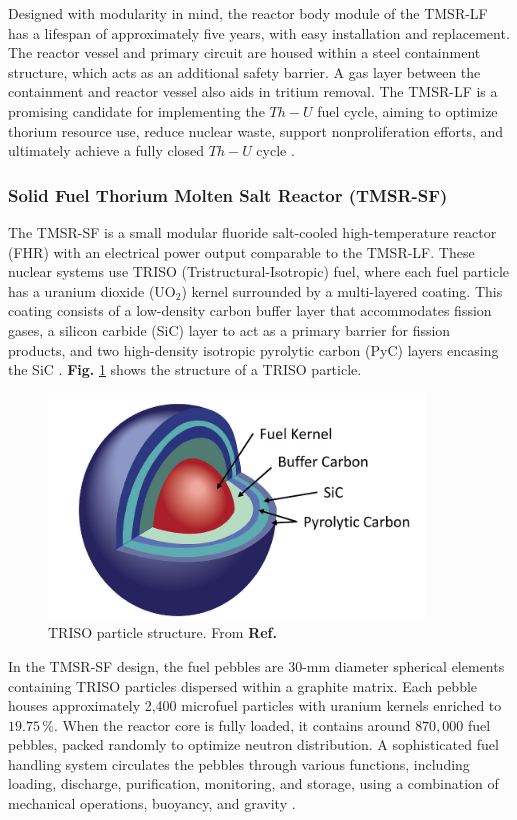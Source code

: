 Designed with modularity in mind, the reactor body module of the TMSR-LF has a lifespan of approximately five years, with easy installation and replacement. The reactor vessel and primary circuit are housed within a steel containment structure, which acts as an additional safety barrier. A gas layer between the containment and reactor vessel also aids in tritium removal. The TMSR-LF is a promising candidate for implementing the \(Th-U\) fuel cycle, aiming to optimize thorium resource use, reduce nuclear waste, support nonproliferation efforts, and ultimately achieve a fully closed \(Th-U\) cycle \cite{TMSR_book}.

\subsubsection{Solid Fuel Thorium Molten Salt Reactor (TMSR-SF)}

The TMSR-SF is a small modular fluoride salt-cooled high-temperature reactor (FHR) with an electrical power output comparable to the TMSR-LF. These nuclear systems use TRISO (Tristructural-Isotropic) fuel, where each fuel particle has a uranium dioxide (\(\text{UO}_2\)) kernel surrounded by a multi-layered coating. This coating consists of a low-density carbon buffer layer that accommodates fission gases, a silicon carbide (SiC) layer to act as a primary barrier for fission products, and two high-density isotropic pyrolytic carbon (PyC) layers encasing the SiC \cite{TRISO, IAEA_TRISO_REPORT}. \textbf{Fig.} \ref{fig:TRISO} shows the structure of a TRISO particle.

\begin{figure}[H]
    \centering
    \includegraphics[scale=0.5]{Kap6/Figures_Kap6/TRISO_particle.png}
    \caption{TRISO particle structure. From \textbf{Ref.} \cite{IAEA_TRISO_REPORT}}
    \label{fig:TRISO}
\end{figure}

In the TMSR-SF design, the fuel pebbles are 30-mm diameter spherical elements containing TRISO particles dispersed within a graphite matrix. Each pebble houses approximately 2,400 microfuel particles with uranium kernels enriched to \(19.75 \, \%\). When the reactor core is fully loaded, it contains around \(870,000\) fuel pebbles, packed randomly to optimize neutron distribution. A sophisticated fuel handling system circulates the pebbles through various functions, including loading, discharge, purification, monitoring, and storage, using a combination of mechanical operations, buoyancy, and gravity \cite{TMSR_book}.

